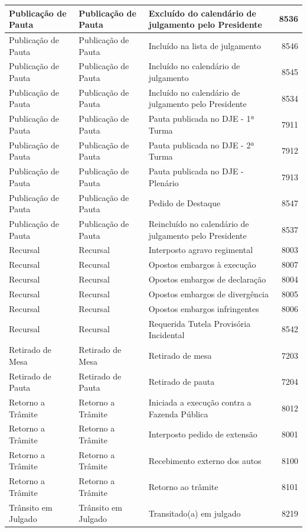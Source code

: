 \documentclass[
]{book}
\begin{document}
\begin{tabular}{l|l|l|r}
\hline
Publicação de Pauta & Publicação de Pauta & Excluído do calendário de julgamento pelo Presidente & 8536\\
\hline
Publicação de Pauta & Publicação de Pauta & Incluído na lista de julgamento & 8546\\
\hline
Publicação de Pauta & Publicação de Pauta & Incluído no calendário de julgamento & 8545\\
\hline
Publicação de Pauta & Publicação de Pauta & Incluído no calendário de julgamento pelo Presidente & 8534\\
\hline
Publicação de Pauta & Publicação de Pauta & Pauta publicada no DJE - 1ª Turma & 7911\\
\hline
Publicação de Pauta & Publicação de Pauta & Pauta publicada no DJE - 2ª Turma & 7912\\
\hline
Publicação de Pauta & Publicação de Pauta & Pauta publicada no DJE - Plenário & 7913\\
\hline
Publicação de Pauta & Publicação de Pauta & Pedido de Destaque & 8547\\
\hline
Publicação de Pauta & Publicação de Pauta & Reincluído no calendário de julgamento pelo Presidente & 8537\\
\hline
Recursal & Recursal & Interposto agravo regimental & 8003\\
\hline
Recursal & Recursal & Opostos embargos à execução & 8007\\
\hline
Recursal & Recursal & Opostos embargos de declaração & 8004\\
\hline
Recursal & Recursal & Opostos embargos de divergência & 8005\\
\hline
Recursal & Recursal & Opostos embargos infringentes & 8006\\
\hline
Recursal & Recursal & Requerida Tutela Provisória Incidental & 8542\\
\hline
Retirado de Mesa & Retirado de Mesa & Retirado de mesa & 7203\\
\hline
Retirado de Pauta & Retirado de Pauta & Retirado de pauta & 7204\\
\hline
Retorno a Trâmite & Retorno a Trâmite & Iniciada a execução contra a Fazenda Pública & 8012\\
\hline
Retorno a Trâmite & Retorno a Trâmite & Interposto pedido de extensão & 8001\\
\hline
Retorno a Trâmite & Retorno a Trâmite & Recebimento externo dos autos & 8100\\
\hline
Retorno a Trâmite & Retorno a Trâmite & Retorno ao trâmite & 8101\\
\hline
Trânsito em Julgado & Trânsito em Julgado & Transitado(a) em julgado & 8219\\
\hline
\end{tabular}
\end{document}
